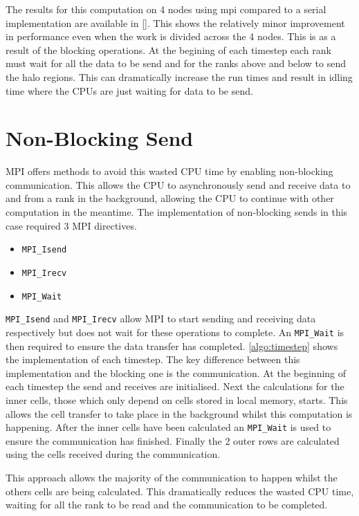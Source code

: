\documentclass{article}
\begin{document}
\begin{multicols}{2}
The results for this computation on 4 nodes using mpi compared to a serial
implementation are available in \autoref{}. This shows the relatively minor
improvement in performance even when the work is divided across the 4 nodes.
This is as a result of the blocking operations. At the begining of each
timestep each rank must wait for all the data to be send and for the ranks
above and below to send the halo regions. This can dramatically increase the
run times and result in idling time where the CPUs are just waiting for data to
be send.

\section{Non-Blocking Send}

MPI offers methods to avoid this wasted CPU time by enabling non-blocking
communication. This allows the CPU to asynchronously send and receive data
to and from a rank in the background, allowing the CPU to continue with other
computation in the meantime. The implementation of non-blocking sends in this
case required 3 MPI directives.

\begin{itemize}
    \item{\verb|MPI_Isend|}
    \item{\verb|MPI_Irecv|}
    \item{\verb|MPI_Wait|}
\end{itemize}

\verb|MPI_Isend| and \verb|MPI_Irecv| allow MPI to start sending and receiving
data respectively but does not wait for these operations to complete. An
\verb|MPI_Wait| is then required to ensure the data transfer has completed.
\autoref{algo:timestep} shows the implementation of each timestep. The key
difference between this implementation and the blocking one is the
communication. At the beginning of each timestep the send and receives are
initialised. Next the calculations for the inner cells, those which only depend
on cells stored in local memory, starts. This allows the cell transfer to take
place in the background whilst this computation is happening. After the inner
cells have been calculated an \verb|MPI_Wait| is used to ensure the
communication has finished. Finally the 2 outer rows are calculated using the
cells received during the communication.

This approach allows the majority of the communication to happen whilst the
others cells are being calculated. This dramatically reduces the wasted CPU
time, waiting for all the rank to be read and the communication to be
completed.


\end{multicols}
\end{document}
